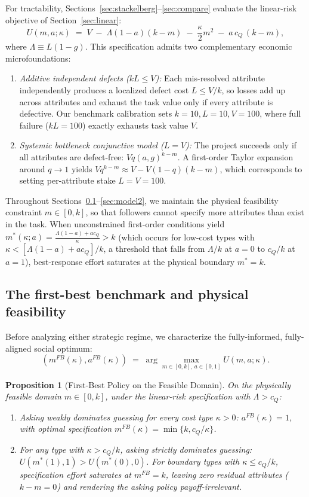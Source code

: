 \documentclass[11pt]{article}
\newtheorem{proposition}{Proposition}
\begin{document}
For tractability, Sections~\ref{sec:stackelberg}--\ref{sec:compare} evaluate the linear-risk objective of Section~\ref{sec:linear}:
\[
U(m,a;\kappa) \;=\; V \;-\; \Lambda(1-a)(k-m) \;-\; \frac{\kappa}{2}m^2 \;-\; a\,c_Q\,(k-m),
\]
where $\Lambda \equiv L(1-g)$. This specification admits two complementary economic microfoundations:
\begin{enumerate}[leftmargin=*]
\item \emph{Additive independent defects ($k L \le V$):} Each mis-resolved attribute independently produces a localized defect cost $L \le V/k$, so losses add up across attributes and exhaust the task value only if every attribute is defective. Our benchmark calibration sets $k=10, L=10, V=100$, where full failure ($k L = 100$) exactly exhausts task value $V$.
\item \emph{Systemic bottleneck conjunctive model ($L = V$):} The project succeeds only if all attributes are defect-free: $V q(a,g)^{k-m}$. A first-order Taylor expansion around $q \to 1$ yields $V q^{k-m} \approx V - V(1-q)(k-m)$, which corresponds to setting per-attribute stake $L = V = 100$.
\end{enumerate}
Throughout Sections~\ref{sec:firstbest}--\ref{sec:model2}, we maintain the physical feasibility constraint $m \in [0, k]$, so that followers cannot specify more attributes than exist in the task. When unconstrained first-order conditions yield $m^*(\kappa;a) = \frac{\Lambda(1-a) + ac_Q}{\kappa} > k$ (which occurs for low-cost types with $\kappa < [\Lambda(1-a) + a c_Q]/k$, a threshold that falls from $\Lambda/k$ at $a=0$ to $c_Q/k$ at $a=1$), best-response effort saturates at the physical boundary $m^* = k$.

\subsection{The first-best benchmark and physical feasibility}
\label{sec:firstbest}

Before analyzing either strategic regime, we characterize the fully-informed, fully-aligned social optimum:
\[
(m^{FB}(\kappa), a^{FB}(\kappa)) \;=\; \arg\max_{m\in[0,k],\,a\in[0,1]} U(m,a;\kappa).
\]

\begin{proposition}[First-Best Policy on the Feasible Domain]\label{prop:firstbest}
On the physically feasible domain $m \in [0, k]$, under the linear-risk specification with $\Lambda > c_Q$:
\begin{enumerate}[label=(\roman*)]
\item Asking weakly dominates guessing for every cost type $\kappa > 0$: $a^{FB}(\kappa) = 1$, with optimal specification $m^{FB}(\kappa) = \min\{k, c_Q/\kappa\}$.
\item For any type with $\kappa > c_Q/k$, asking strictly dominates guessing: $U(m^*(1), 1) > U(m^*(0), 0)$. For boundary types with $\kappa \le c_Q/k$, specification effort saturates at $m^{FB} = k$, leaving zero residual attributes ($k-m=0$) and rendering the asking policy payoff-irrelevant.
\end{enumerate}
\end{proposition}
\end{document}
